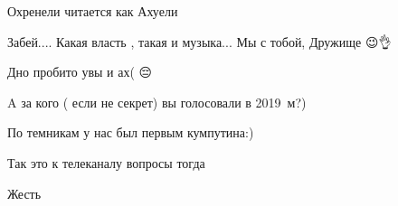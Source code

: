 \begin{itemize}
Охренели читается как Ахуели

 
Забей....
Какая власть , такая и музыка... Мы с тобой, Дружище 😉👌

 

Дно пробито
увы и ах( 😔

 
A за кого ( если не секрет) вы голосовали в 2019~м?)

 
По темникам у нас был первым кумпутина:)

 
Так это к телеканалу вопросы тогда

 
Жесть

 

\end{itemize}
